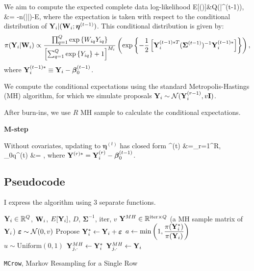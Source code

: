 \documentclass{template}
\begin{document}
We aim to compute the expected complete data log-likelihood \bal 
E[\ell(\boldsymbol{\eta})]&\equiv Q(\boldsymbol{\eta}|\boldsymbol{\eta}^{(t-1)}),\\
&= -n\log(|\boldsymbol{\Sigma}|)-\sumi E,
\eal 
where the expectation is taken with respect to the conditional distribution of $\mathbf{Y}_i|(\mathbf{W}_i; \boldsymbol{\eta}^{(t-1)})$. This conditional distribution is  given by: 
\begin{equation}
    \pi(\mathbf{Y}_i|\mathbf{W}_i) \propto \dfrac{\prod_{q=1}^Q \text{exp}\left\{W_{iq}Y_{iq}\right\}}{\left[\sum_{q=1}^Q \text{exp}\left\{Y_{iq}\right\}+1\right]^{M_i}} \left(\text{exp}\left\{-\dfrac{1}{2}\left[\mathbf{Y}_i^{(t-1)*T}(\boldsymbol{\Sigma}^{(t-1)})^{-1}\mathbf{Y}_i^{(t-1)*}\right]\right\}\right),
\end{equation}
where $\mathbf{Y}_i^{(t-1)*}\equiv \mathbf{Y}_i- \boldsymbol{\beta}_0^{(t-1)}$.

We compute the conditional expectations using the standard Metropolis-Hastings (MH) algorithm, for which we simulate proposals $\mathbf{Y}_i\sim \mathcal{N}(\mathbf{Y}_i^{(r-1)},v\mathbf{I})$.

After burn-ins, we use $R$ MH sample to calculate the conditional expectations.

\noindent\textbf{M-step}

Without covariates, updating to  $\boldsymbol{\eta}^{(t)}$ has closed form
\bal 
\boldsymbol{\Sigma}^{(t)} &=\sum_{r=1}^{R},\\
\boldsymbol{\beta}_{0q}^{(t)} &= \onen\sumi {},
\eal 
where $\mathbf{Y}^{(r)*}=\mathbf{Y}_i^{(r)}-\boldsymbol{\beta}_0^{(t-1)}$.


\subsection{Pseudocode}

 I express the algorithm using 3 separate functions.


\FloatBarrier 
\begin{algorithm}[ht!]
\begin{algorithmic}[1]
\Input $\mathbf{Y}_i\in\mathbb{R}^{Q}$, $\mathbf{W}_i$, $E[\mathbf{Y}_i]$, $D$, $\boldsymbol{\Sigma}^{-1}$, iter, $v$
\Output $\mathbf{Y}^{MH}\in\mathbb{R}^{\text{iter}\times Q}$ (a MH sample matrix of $\mathbf{Y}_i$)
\State $\boldsymbol{\varepsilon} \sim \mathcal{N}(0,v)$
\State Propose $\mathbf{Y}_i^* \gets \mathbf{Y}_i+\boldsymbol{\varepsilon}$
\State $a \gets \min\left(1,\dfrac{\pi(\mathbf{Y}_i^*)}{\pi(\mathbf{Y}_i)}\right)$
\State $u \sim \text{Uniform}(0,1)$
\State $\mathbf{Y}^{MH}_{j,\cdot} \gets \mathbf{Y}_i^*$
\Else 
\State $\mathbf{Y}^{MH}_{j,\cdot} \gets \mathbf{Y}_i$
\EndIf
\EndFor
{}
\end{algorithmic}
\caption{\texttt{MCrow}, Markov Resampling for a Single Row}
\end{algorithm}
\end{document}
